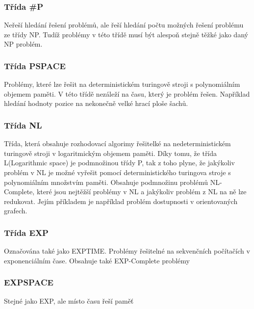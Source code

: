 \subsubsection{Třída \#P}
Neřeší hledání řešení problémů, ale řeší hledání počtu možných řešení problému ze třídy NP. Tudíž problémy v této třídě musí být alespoň stejně těžké jako
daný NP problém. 

\subsubsection{Třída PSPACE}
Problémy, které lze řešit na deterministickém turingově stroji s polynomiálním objemem paměti. V této třídě nezáleží na času, který je problém řešen.
Například hledání hodnoty pozice na nekonečně velké hrací ploše šachů.

\subsubsection{Třída NL}
Třída, která obsahuje rozhodovací algorimy řešitelké na nedeterministickém turingově stroji v logaritmickým objemem paměti. Díky tomu, že třída L(Logarithmic
space) je podmnožinou třídy P, tak z toho plyne, že jakýkoliv problém v NL je možné vyřešit pomocí deterministického turingova stroje s polynomiálním množstvím
paměti. Obsahuje podmnožinu problémů NL-Complete, které jsou nejtěžší problémy v NL a jakýkoliv problém z NL na ně lze redukovat. Jejím příkladem je například
problém dostupnosti v orientovaných grafech.

\subsubsection{Třída EXP}
Označována také jako EXPTIME. Problémy řešitelné na sekvenčních počítačích v exponenciálním čase. Obsahuje také EXP-Complete problémy

\subsubsection{EXPSPACE}
Stejné jako EXP, ale místo času řeší paměť


